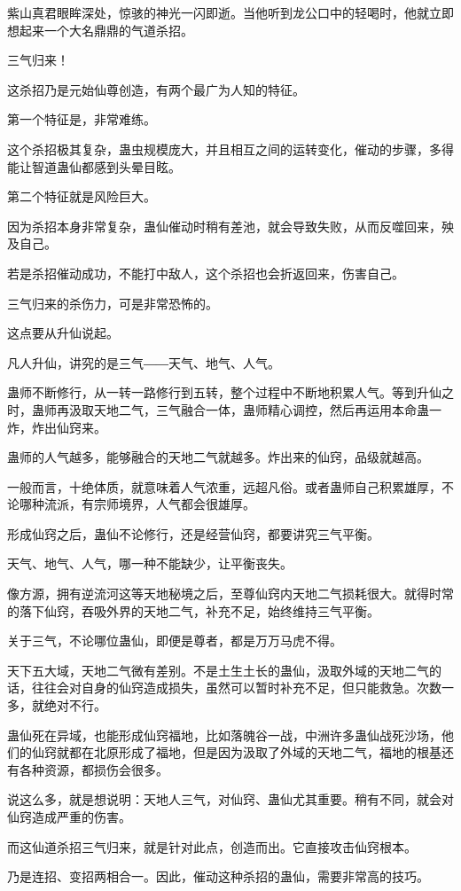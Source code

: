 \begin{this_body}
紫山真君眼眸深处，惊骇的神光一闪即逝。当他听到龙公口中的轻喝时，他就立即想起来一个大名鼎鼎的气道杀招。

三气归来！

这杀招乃是元始仙尊创造，有两个最广为人知的特征。

第一个特征是，非常难练。

这个杀招极其复杂，蛊虫规模庞大，并且相互之间的运转变化，催动的步骤，多得能让智道蛊仙都感到头晕目眩。

第二个特征就是风险巨大。

因为杀招本身非常复杂，蛊仙催动时稍有差池，就会导致失败，从而反噬回来，殃及自己。

若是杀招催动成功，不能打中敌人，这个杀招也会折返回来，伤害自己。

三气归来的杀伤力，可是非常恐怖的。

这点要从升仙说起。

凡人升仙，讲究的是三气――天气、地气、人气。

蛊师不断修行，从一转一路修行到五转，整个过程中不断地积累人气。等到升仙之时，蛊师再汲取天地二气，三气融合一体，蛊师精心调控，然后再运用本命蛊一炸，炸出仙窍来。

蛊师的人气越多，能够融合的天地二气就越多。炸出来的仙窍，品级就越高。

一般而言，十绝体质，就意味着人气浓重，远超凡俗。或者蛊师自己积累雄厚，不论哪种流派，有宗师境界，人气都会很雄厚。

形成仙窍之后，蛊仙不论修行，还是经营仙窍，都要讲究三气平衡。

天气、地气、人气，哪一种不能缺少，让平衡丧失。

像方源，拥有逆流河这等天地秘境之后，至尊仙窍内天地二气损耗很大。就得时常的落下仙窍，吞吸外界的天地二气，补充不足，始终维持三气平衡。

关于三气，不论哪位蛊仙，即便是尊者，都是万万马虎不得。

天下五大域，天地二气微有差别。不是土生土长的蛊仙，汲取外域的天地二气的话，往往会对自身的仙窍造成损失，虽然可以暂时补充不足，但只能救急。次数一多，就绝对不行。

蛊仙死在异域，也能形成仙窍福地，比如落魄谷一战，中洲许多蛊仙战死沙场，他们的仙窍就都在北原形成了福地，但是因为汲取了外域的天地二气，福地的根基还有各种资源，都损伤会很多。

说这么多，就是想说明：天地人三气，对仙窍、蛊仙尤其重要。稍有不同，就会对仙窍造成严重的伤害。

而这仙道杀招三气归来，就是针对此点，创造而出。它直接攻击仙窍根本。

乃是连招、变招两相合一。因此，催动这种杀招的蛊仙，需要非常高的技巧。


\end{this_body}
